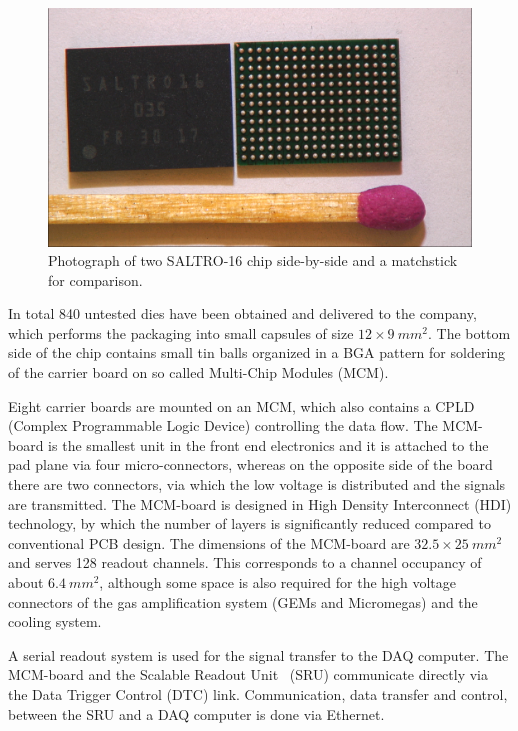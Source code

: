 \begin{figure}
    \centering
    \includegraphics[width=.5\linewidth]{Tracker/TPC_Bonn/plots/TPC-Electronics_JonssonsALTRO_Chip-Photo_07062018}
    \caption{Photograph of two SALTRO-16 chip side-by-side and a matchstick for comparison.}
    \label{fig:TPC:SaltroPic}
\end{figure}

In total 840 untested dies have been obtained and delivered to the company, which performs the packaging into small capsules of size $12\times\SI{9}{mm^2}$. The bottom side of the chip contains small tin balls organized in a BGA pattern for soldering of the carrier board on so called Multi-Chip Modules (MCM).

Eight carrier boards are mounted on an MCM, which also contains a CPLD (Complex Programmable Logic Device) controlling the data flow. The MCM-board is the smallest unit in the front end electronics and it is attached to the pad plane via four micro-connectors, whereas on the opposite side of the board there are two connectors, via which the low voltage is distributed and the signals are transmitted. The MCM-board is designed in High Density Interconnect (HDI) technology, by which the number of layers is significantly reduced compared to conventional PCB design. The dimensions of the MCM-board are $32.5 \times \SI{25}{mm^2}$ and serves 128 readout channels. This corresponds to a channel occupancy of about $\SI{6.4}{mm^{2}}$, although some space is also required for the high voltage connectors of the gas amplification system (GEMs and Micromegas) and the cooling system.

A serial readout system is used for the signal transfer to the DAQ computer. The MCM-board and the Scalable Readout Unit~\cite{1748-0221-8-03-C03015} (SRU) communicate directly via the Data Trigger Control (DTC) link. Communication, data transfer and control, between the SRU and a DAQ computer is done via Ethernet.

